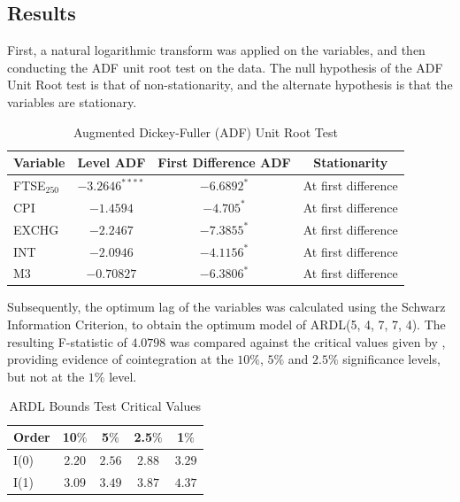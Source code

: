 \documentclass[11pt,a4paper]{article}
\newcommand{\citeboth}[1]{\citeauthor{#1} \citep{#1}}
\begin{document}
\subsection{Results}

First, a natural logarithmic transform was applied on the variables, and 
then conducting the ADF unit root test on the data. The null hypothesis of the 
ADF Unit Root test is that of non-stationarity, and the alternate hypothesis 
is that the variables are stationary.


\begin{table}[h!]
    \centering
    \caption{Augmented Dickey-Fuller (ADF) Unit Root Test}
    \begin{tabular}{lccc}
        \toprule
        \textbf{Variable} & \textbf{Level ADF} & \textbf{First Difference ADF} & \textbf{Stationarity} \\
        \midrule
        FTSE$_{250}$ & $-3.2646^{****}$ & $-6.6892^{*}$ & At first difference \\
        CPI          & $-1.4594$ & $-4.705^{*}$ & At first difference \\
        EXCHG        & $-2.2467$ & $-7.3855^{*}$ & At first difference \\
        INT          & $-2.0946$ & $-4.1156^{*}$ & At first difference \\
        M3           & $-0.70827$ & $-6.3806^{*}$ & At first difference \\
        \bottomrule
    \end{tabular}
\end{table}


Subsequently, the optimum lag of the variables was calculated using the 
Schwarz Information Criterion, to obtain the optimum model 
of ARDL(5, 4, 7, 7, 4). The resulting F-statistic of $4.0798$ was compared against the critical values
given by \citeboth{pesaran2001}, providing evidence of cointegration 
at the $10\%$, $5\%$ and $2.5\%$ significance levels, but not at the $1\%$ 
level.

\begin{table}[h!]
    \centering
    \caption{ARDL Bounds Test Critical Values}
    \begin{tabular}{lcccc}
        \toprule
        \textbf{Order} & \textbf{10$\%$} & \textbf{5$\%$} & \textbf{2.5$\%$} & \textbf{1$\%$} \\
        \midrule
        I(0) & $2.20$ & $2.56$ & $2.88$ & $3.29$ \\
        I(1) & $3.09$ & $3.49$ & $3.87$  & $4.37$ \\
        \bottomrule
    \end{tabular}
\end{table}
\end{document}
